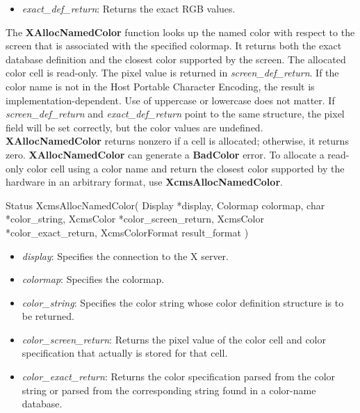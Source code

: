 \documentclass{report}
\begin{document}
\begin{itemize}
\begin{itemize}
                \item \textit{exact\_def\_return}: Returns the exact RGB values.
            \end{itemize}
            \noindent
            The \textbf{XAllocNamedColor} function looks up the named color with respect to the screen that is associated with the specified colormap. It returns both the exact database definition and the closest color supported by the screen. The allocated color cell is read-only. The pixel value is returned in \textit{screen\_def\_return}. If the color name is not in the Host Portable Character Encoding, the result is implementation-dependent. Use of uppercase or lowercase does not matter. If \textit{screen\_def\_return} and \textit{exact\_def\_return} point to the same structure, the pixel field will be set correctly, but the color values are undefined. \textbf{XAllocNamedColor} returns nonzero if a cell is allocated; otherwise, it returns zero.
            \bigbreak \noindent
            \textbf{XAllocNamedColor} can generate a \textbf{BadColor} error.
            \bigbreak \noindent
            To allocate a read-only color cell using a color name and return the closest color supported by the hardware in an arbitrary format, use \textbf{XcmsAllocNamedColor}.
            \bigbreak \noindent 
            \begin{cppcode}
                Status XcmsAllocNamedColor(
                    Display *display,
                    Colormap colormap,
                    char *color_string,
                    XcmsColor *color_screen_return,
                    XcmsColor *color_exact_return,
                    XcmsColorFormat result_format
                )
            \end{cppcode}
            \bigbreak \noindent
            \begin{itemize}
                \item \textit{display}: Specifies the connection to the X server.
                \item \textit{colormap}: Specifies the colormap.
                \item \textit{color\_string}: Specifies the color string whose color definition structure is to be returned.
                \item \textit{color\_screen\_return}: Returns the pixel value of the color cell and color specification that actually is stored for that cell.
                \item \textit{color\_exact\_return}: Returns the color specification parsed from the color string or parsed from the corresponding string found in a color-name database.

\end{itemize}
\end{itemize}
\end{document}

